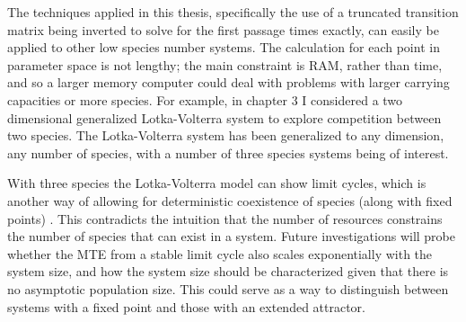 The techniques applied in this thesis, specifically the use of a truncated transition matrix being inverted to solve for the first passage times exactly, can easily be applied to other low species number systems. 
The calculation for each point in parameter space is not lengthy; the main constraint is RAM, rather than time, and so a larger memory computer could deal with problems with larger carrying capacities or more species. %
For example, in chapter 3 I considered a two dimensional generalized Lotka-Volterra system to explore competition between two species. 
The Lotka-Volterra system has been generalized to any dimension, any number of species, with a number of three species systems being of interest. 
\iffalse
From the two dimensional Lotka-Volterra system one arrives at the predator-prey system by choosing the parameters correctly. 
One can also move to the third dimension, in order to account for a third species in the system. 
This allows for the investigation of many systems of interest, with much more diversity. 
The simplest extension in this regard would be to have three species all with overlapping niches \cite{MacArthur1970}. 
I could observe how a species whose niche is situated between those of two others (such that they each overlap with the first species but not with each other) would go extinct more readily as the overlap of the encroaching species is increased. 
\fi
With three species the Lotka-Volterra model can show limit cycles, which is another way of allowing for deterministic coexistence of species (along with fixed points) \cite{Smale1976,Armstrong1976}. 
This contradicts the intuition that the number of resources constrains the number of species that can exist in a system. 
Future investigations will probe whether the MTE from a stable limit cycle also scales exponentially with the system size, and how the system size should be characterized given that there is no asymptotic population size. 
This could serve as a way to distinguish between systems with a fixed point and those with an extended attractor. 
